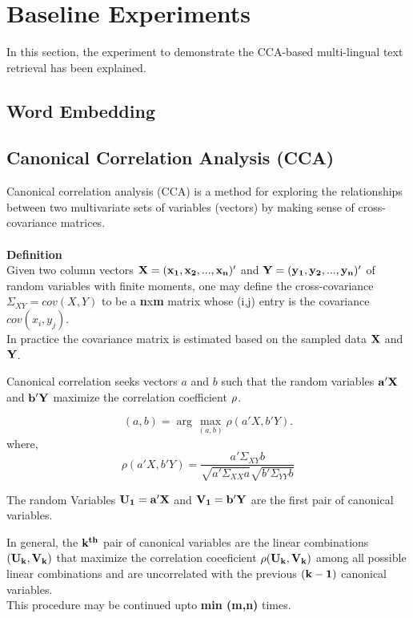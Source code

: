\documentclass{article} %
\begin{document}
\section{Baseline Experiments}
\label{experiment}

In this section, the experiment to demonstrate the CCA-based multi-lingual text retrieval has been explained.
\subsection{Word Embedding}
\subsection{Canonical Correlation Analysis (CCA)}

Canonical correlation analysis (CCA) is a method for exploring the relationships between two multivariate sets of variables (vectors) by making sense of cross-covariance matrices.
\\\\
{\bf Definition}\\
Given two column vectors $\bf{{X} = (x_1, x_2,..., x_n)'}$ and  $\bf{{Y} = (y_1, y_2,..., y_n)'}$ of random variables with finite moments, one may define the cross-covariance ${\Sigma_{XY}} = cov({X},{Y})$ to be a {\bf n}x{\bf m} matrix whose (i,j) entry is the covariance $cov(x_i,y_j)$.\\
In practice the covariance matrix is estimated based on the sampled data $\bf{X}$ and $\bf{Y}$.


Canonical correlation seeks vectors ${a}$ and ${b}$ such that the random variables $\bf{a'X}$ and $\bf{b'Y}$ maximize the correlation coefficient ${\bf \rho}$.

\begin{equation}
		(a,b) = \arg \max_{(a,b)} {\rho}({a'X},{b'Y}).
\end{equation}
where,
\begin{equation}	
	\rho({a'X},{b'Y}) = \frac{a' \Sigma_{XY} b}{\sqrt{a'\Sigma_{XX}a}\sqrt{b'\Sigma_{YY}b}}	
\end{equation}

The random Variables $\bf{U_1 = a'X}$ and $\bf{V_1 = b'Y}$ are the first pair of canonical variables.

In general, the $\bf{k^{th}}$ pair of canonical variables are the linear combinations $(\bf{U_k,V_k})$ that maximize the correlation coeeficient $\bf{\rho}(\bf{U_k,V_k})$ among all possible linear combinations and are uncorrelated with the previous $\bf{(k-1)}$ canonical variables.\\
This procedure may be continued upto {\bf{min (m,n)}} times.
\end{document}
